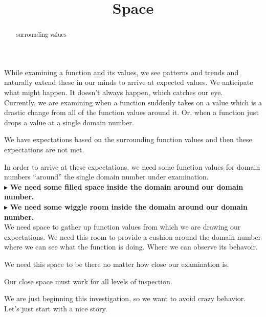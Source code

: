 \documentclass{ximera}
\title{Space}
\begin{document}
\begin{abstract}
surrounding values
\end{abstract}
\maketitle




While examining a function and its values, we see patterns and trends and naturally extend these in our minds to arrive at expected values. We anticipate what might happen.  It doesn't always happen, which catches our eye. \\

Currently, we are examining when a function suddenly takes on a value which is a drastic change from all of the function values around it.  Or, when a function just drops a value at a single domain number.

We have expectations based on the surrounding function values and then these expectations are not met.

In order to arrive at these expectations, we need some function values for domain numbers ``around'' the single domain number under examination. \\


$\blacktriangleright$ \textbf{\textcolor{purple!85!blue}{We need some filled space inside the domain around our domain number.}} \\

$\blacktriangleright$ \textbf{\textcolor{purple!85!blue}{We need some wiggle room inside the domain around our domain number.}} \\




We need space to gather up function values from which we are drawing our expectations.  We need this room to provide a cushion around the domain number where we can see what the function is doing. Where we can observe its behavoir. 


We need this space to be there no matter how close our examination is.  


Our close space must work for all levels of inspection.


We are just beginning this investigation, so we want to avoid crazy behavior.  Let's just start with a nice story.
\end{document}
